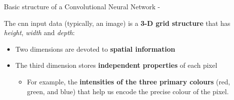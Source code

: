 %
%
%


\begin{frame}[t,allowframebreaks]{Basic structure of a Convolutional Neural Network -}

    The \gls{cnn} 
    input data (typically, an image) is a {\bf 3-D grid structure}
    that has {\it height}, {\it width} and {\it depth}:
    \begin{itemize}
        \item Two dimensions are devoted to {\bf spatial information}
        \item The third dimension stores {\bf independent properties} of each pixel
        \begin{itemize}
            \item For example, the {\bf intensities of the three primary colours}
             (red, green, and blue) that help us encode the precise colour of the pixel.
        \end{itemize}
    \end{itemize}


\end{frame}
